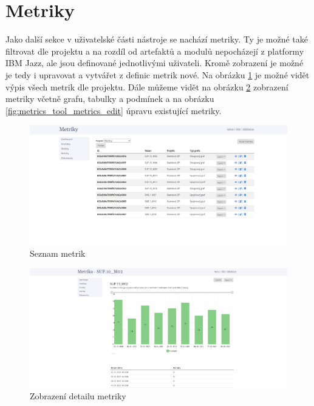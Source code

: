 \documentclass[czech,master]{diploma}
\begin{document}
\newpage

\section{Metriky}

Jako další sekce v uživatelské části nástroje se nachází metriky. Ty je možné také filtrovat dle projektu a na rozdíl od artefaktů a modulů nepocházejí z platformy IBM Jazz, ale jsou definované jednotlivými uživateli. Kromě zobrazení je možné je tedy i upravovat a vytvářet z definic metrik nové. Na obrázku \ref{fig:metrics_tool_metrics} je možné vidět výpis všech metrik dle projektu. Dále můžeme vidět na obrázku \ref{fig:metrics_tool_metrics_detail} zobrazení metriky včetně grafu, tabulky a podmínek a na obrázku \ref{fig:metrics_tool_metrics_edit} úpravu existující metriky.

\begin{figure}[!ht]
    \centering
    \includegraphics[width=1\textwidth]{Diplomka/Figures/metrics_tool/metrics.jpg}
    \caption{Seznam metrik}
    \label{fig:metrics_tool_metrics}
\end{figure}

\begin{figure}[!ht]
    \centering
    \includegraphics[width=1\textwidth]{Diplomka/Figures/metrics_tool/metrics_detail.jpg}
    \caption{Zobrazení detailu metriky}
    \label{fig:metrics_tool_metrics_detail}
\end{figure}
\end{document}

